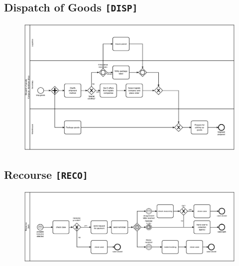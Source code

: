 \clearpage


\begin{landscape}
\thispagestyle{empty}
\section*{Dispatch of Goods \texttt{[DISP]}}
\begin{figure}[!h]
    \centering
    \includegraphics[width=1.3\textwidth]{figures/benchmark/Dispatch-of-goods.png}
\end{figure}

\end{landscape}




\begin{landscape}
\thispagestyle{empty}
\section*{Recourse \texttt{[RECO]}}
\begin{figure}[!h]
    \centering
    \includegraphics[width=1.3\textwidth]{figures/benchmark/Recourse.png}
\end{figure}
\end{landscape}

